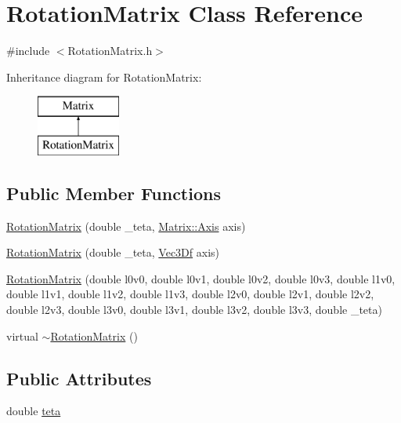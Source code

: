 \hypertarget{class_rotation_matrix}{
\section{RotationMatrix Class Reference}
\label{class_rotation_matrix}
}


{\ttfamily \#include $<$RotationMatrix.h$>$}

Inheritance diagram for RotationMatrix:\begin{figure}[H]
\begin{center}
\leavevmode
\includegraphics[height=2.000000cm]{class_rotation_matrix}
\end{center}
\end{figure}
\subsection*{Public Member Functions}
\begin{DoxyCompactItemize}
\item 
\hyperlink{class_rotation_matrix_a43bae532c9142e771f42b304f0f5d558}{RotationMatrix} (double \_\-teta, \hyperlink{class_matrix_af69237b098cb1876beaa3375f7dacbc1}{Matrix::Axis} axis)
\item 
\hyperlink{class_rotation_matrix_ac4b890d0566925a5ee7890defe1b5926}{RotationMatrix} (double \_\-teta, \hyperlink{class_vec3_d}{Vec3Df} axis)
\item 
\hyperlink{class_rotation_matrix_a0fbd7c33d9c6840f47b3c0b7479c682d}{RotationMatrix} (double l0v0, double l0v1, double l0v2, double l0v3, double l1v0, double l1v1, double l1v2, double l1v3, double l2v0, double l2v1, double l2v2, double l2v3, double l3v0, double l3v1, double l3v2, double l3v3, double \_\-teta)
\item 
virtual \hyperlink{class_rotation_matrix_acfb2b663eb18a3b604dc3d07afae16f6}{$\sim$RotationMatrix} ()
\end{DoxyCompactItemize}
\subsection*{Public Attributes}
\begin{DoxyCompactItemize}
\item 
double \hyperlink{class_rotation_matrix_aec9f847b2b39893132122cc6da4d9cd7}{teta}
\end{DoxyCompactItemize}


